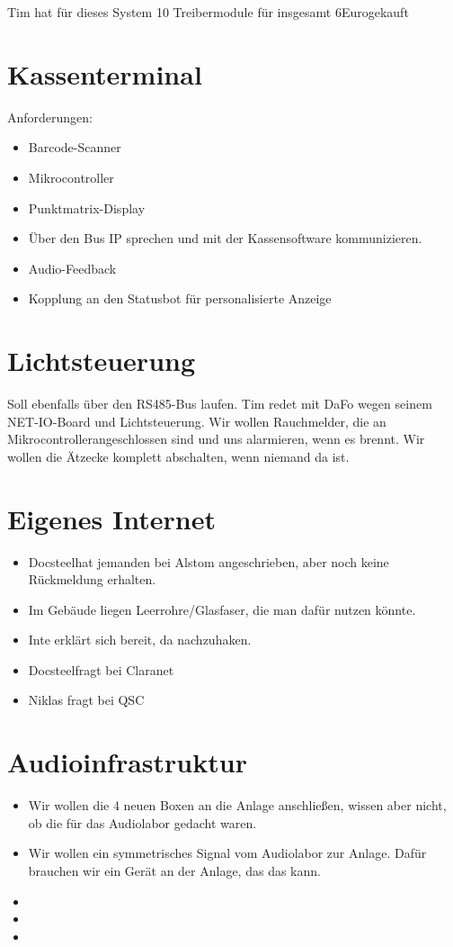 \documentclass{scrartcl}
\newcommand\docsteel{Docsteel}
\newcommand\euro{Euro}
\newcommand\uc{Mikrocontroller}
\begin{document}
Tim hat für dieses System 10 Treibermodule für insgesamt 6\euro gekauft

\section{Kassenterminal}

Anforderungen:
\begin{itemize}
\item{} Barcode-Scanner
\item{} \uc
\item{} Punktmatrix-Display
\item{} Über den Bus IP sprechen und mit der Kassensoftware kommunizieren.
\item{} Audio-Feedback
\item{} Kopplung an den Statusbot für personalisierte Anzeige
\end{itemize}

\section{Lichtsteuerung}

Soll ebenfalls über den RS485-Bus laufen.
Tim redet mit DaFo wegen seinem NET-IO-Board und Lichtsteuerung.
Wir wollen Rauchmelder, die an \uc angeschlossen sind und uns alarmieren, wenn es brennt.
Wir wollen die Ätzecke komplett abschalten, wenn niemand da ist.


\section{Eigenes Internet}

\begin{itemize}
\item{} \docsteel hat jemanden bei Alstom angeschrieben, aber noch keine Rückmeldung erhalten.
\item{} Im Gebäude liegen Leerrohre/Glasfaser, die man dafür nutzen könnte.
\item{} Inte erklärt sich bereit, da nachzuhaken.
\item{} \docsteel fragt bei Claranet
\item{} Niklas fragt bei QSC
\end{itemize}

\section{Audioinfrastruktur}

\begin{itemize}
\item{} Wir wollen die 4 neuen Boxen an die Anlage anschließen, wissen aber nicht, ob die für das Audiolabor gedacht waren.
\item{} Wir wollen ein symmetrisches Signal vom Audiolabor zur Anlage. Dafür brauchen wir ein Gerät an der Anlage, das das kann.
\item{} 
\item{} 
\item{} 
\end{itemize}
\end{document}
